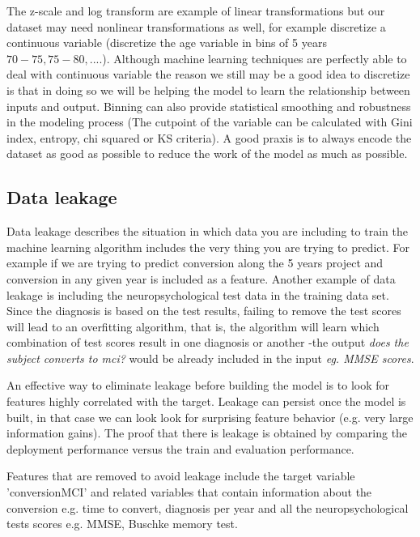 \documentclass[11pt]{article}
\begin{document}
The z-scale and log transform are example of linear transformations but our dataset may need nonlinear transformations as well, for example discretize a continuous variable (discretize the age variable in bins of 5 years $70-75, 75-80, ...$.). Although machine learning techniques are perfectly able to deal with continuous variable the reason we still may be a good idea to discretize is that in doing so we will be helping the model to learn the relationship between inputs and output. Binning can also provide statistical smoothing and robustness in the modeling process (The cutpoint of the variable can be calculated with Gini index, entropy, chi squared or KS criteria).
A good praxis is to always encode the dataset as good as possible to reduce the work of the model as much as possible.

\subsection{Data leakage}
\label{sse:dl}
Data leakage describes the situation in which data you are including to train the machine learning algorithm includes the very thing you are trying to predict. For example if we are trying to predict conversion along the 5 years project and conversion in any given year is included as a feature.
Another example of data leakage is including the neuropsychological test data in the training data set. Since the diagnosis is based on the test results, failing to remove the test scores will lead to an overfitting algorithm, that is, the algorithm will learn which combination of test scores result in one diagnosis or another -the output \emph{does the subject converts to mci?} would be already included in the input \emph{eg. MMSE scores}. 


An effective way to eliminate leakage before building the model is to look for features highly correlated with the target. Leakage can persist once the model is built, in that case we can look look for surprising feature behavior (e.g. very large information gains). The proof that there is leakage is obtained by comparing the deployment performance versus the train and evaluation performance. 

Features that are removed to avoid leakage include the target variable 'conversionMCI' and related variables that contain information about the conversion e.g. time to convert, diagnosis per year and all the neuropsychological tests scores e.g. MMSE, Buschke memory test.
\end{document}
